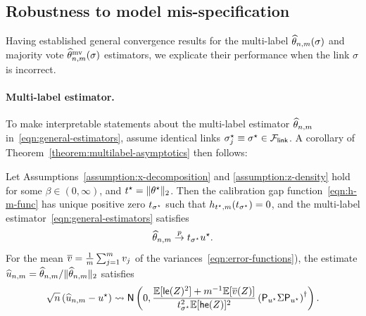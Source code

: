 \subsection{Robustness to model mis-specification}
\label{sec:robustness-model-misspecification}

Having established general convergence results for the multi-label
$\widehat{\theta}_{n,m}(\sigma)$ and majority vote  $\widehat{\theta}^{\textup{mv}}_{n,m}(\sigma)$ estimators, we 
explicate their performance when %
the link $\sigma$ is incorrect. %
\paragraph{Multi-label estimator.}
To make interpretable statements about
the multi-label estimator $\widehat{\theta}_{n,m}$ in~\eqref{eqn:general-estimators},
assume identical links $\sigma_j^\star \equiv \sigma^\star \in
\mathcal{F}_{\mathsf{link}}$.
A corollary of Theorem~\ref{theorem:multilabel-asymptotics}
then follows:
\begin{corollary}
  \label{corollary:lowd-misspcfd-logistic-regression}
  Let Assumptions~\ref{assumption:x-decomposition} and
  \ref{assumption:z-density} hold for some $\beta \in (0, \infty)$, and
  $t^\star = \|{\theta^\star}\|_2$. Then the calibration
  gap function~\eqref{eqn:h-m-func} has unique positive zero
  $t_{\sigma^\star}$ such that
  $h_{t^\star,m}(t_{\sigma^\star}) = 0$, and the multi-label
  estimator~\eqref{eqn:general-estimators} satisfies
  \begin{equation*}
    \widehat{\theta}_{n,m} \stackrel{p}{\rightarrow}  t_{\sigma^\star} u^\star.
  \end{equation*}
  For the mean $\overline{v} = \frac{1}{m} \sum_{j = 1}^m v_j$ of the
  variances~\eqref{eqn:error-functions}), the estimate
  $\widehat{u}_{n,m} = \widehat{\theta}_{n,m} / \|{\widehat{\theta}_{n,m}}\|_2$ satisfies
  \begin{equation*}
    \sqrt{n} \left(\widehat{u}_{n,m} - u^\star\right)
    \rightsquigarrow \mathsf{N}\left(0,
    \frac{\mathbb{E}[\mathsf{le}(Z)^2]  + m^{-1} \mathbb{E}[\overline{v}(Z)]}{t_{\sigma^\star}^2
      \mathbb{E}[\mathsf{he}(Z)]^2}  
    \left({\mathsf{P}_{u^\star} \Sigma \mathsf{P}_{u^\star}}\right)^\dagger\right)  .
  \end{equation*}
\end{corollary}

